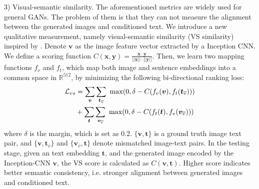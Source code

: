 \documentclass[10pt,twocolumn,letterpaper]{article}
\begin{document}
3) Visual-semantic similarity. The aforementioned metrics are widely used for general GANs. The problem of them is that they can not measure the alignment between the generated images and conditioned text. We introduce a new qualitative measurement, namely visual-semantic similarity (VS similarity) inspired by \cite{vsemb}. Denote $\bm{v}$ as the image feature vector extracted by a Inception CNN.
We define a scoring function $C(\bm{x}, \bm{y})=\frac{\bm{x}\cdot \bm{y}}{||\bm{x}||\cdot ||\bm{y}||}$. 
Then, we learn two mapping functions $f_v$ and $f_t$, which map both image and sentence embeddings into a common space in $\mathbb{R}^{512}$, by minimizing the following bi-directional ranking loss:
\begin{equation}\vspace{-.2cm}
\begin{split}
\mathcal{L}_{vs} &= \sum_{ \bm{v} }\sum_{ \bm{t}_{\overline{v}} }~\max( 0, \delta- C(f_v(\bm{v}), f_t( \bm{t}_{\overline{v}}))) \\
&+ \sum_{ \bm{t} }\sum_{ \bm{v}_{\overline{v}} }~\max( 0,  \delta- C(f_t(\bm{t}), f_v( \bm{v}_{\overline{v}} )))
\end{split}
\vspace{-.2cm}
\end{equation}
where $\delta$ is the margin, which is set as 0.2. $\{\bm{v}, \bm{t}\}$ is a ground truth image text pair, and $\{\bm v, \bm t_{\overline{v}} \}$ and $\{ \bm v_{\overline{v}}, \bm{t} \}$ denote mismatched image-text pairs. In the testing stage, given an text embedding $\bm{t}$, and the generated image encoded by the Inception-CNN $\bm v$, the VS score is calculated as $C(\bm v, \bm{t})$. Higher score indicates better semantic consistency, i.e. stronger alignment between generated images and conditioned text.
\end{document}
